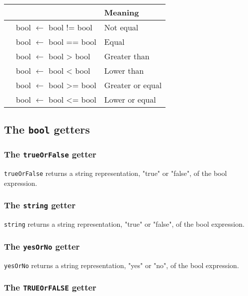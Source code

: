 \documentclass[10pt,openright,twosides,final]{memoir}
\newcommand{\scst}[1]{{\footnotesize\ttfamily\colorbox{light-blue}{"#1"}}}
\newcommand{\gtlinline}[1]{\colorbox{light-blue}{\lstinline[language=gtl]{#1}}}
\begin{document}
\begin{longtable}{>{\ttfamily}l|>{\ttfamily}l|l}
{\bfseries Operator}&{\bfseries Expression type}&{\bfseries Meaning}\\
\hline\endhead
 {!=}&
  {bool $\leftarrow$ bool != bool}&
  {Not equal}\\
 {==}&
  {bool $\leftarrow$ bool == bool}&
  {Equal}\\
 {>}&
  {bool $\leftarrow$ bool > bool}&
  {Greater than}\\
 {<}&
  {bool $\leftarrow$ bool < bool}&
  {Lower than}\\
 {>=}&
  {bool $\leftarrow$ bool >= bool}&
  {Greater or equal}\\
 {<=}&
  {bool $\leftarrow$ bool <= bool}&
  {Lower or equal}\\
\end{longtable}

\subsection{The \texttt{bool} getters}

\subsubsection{The \texttt{trueOrFalse} getter}
\label{sec:trueOrFalseGetter}

\gtlinline{trueOrFalse} returns a string representation, \scst{true} or \scst{false}, of the bool expression.

\subsubsection{The \texttt{string} getter}

\gtlinline{string} returns a string representation, \scst{true} or \scst{false}, of the bool expression.

\subsubsection{The \texttt{yesOrNo} getter}

\gtlinline{yesOrNo} returns a string representation, \scst{yes} or \scst{no}, of the bool expression.

\subsubsection{The \texttt{TRUEOrFALSE} getter}
\label{sec:TRUEOrFALSEGetter}
\end{document}
